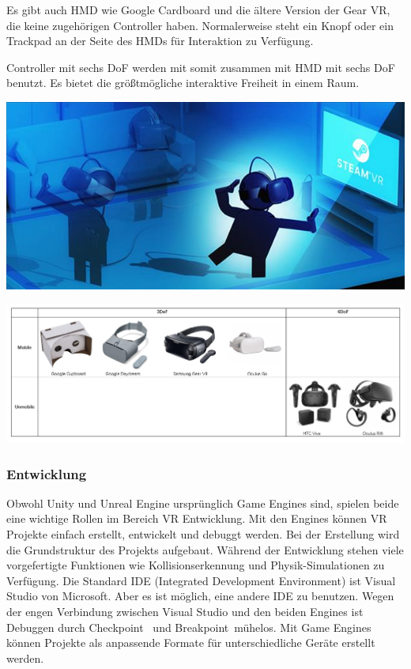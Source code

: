   Es gibt auch HMD wie Google Cardboard und die ältere Version der Gear VR, die keine zugehörigen Controller haben. Normalerweise steht ein Knopf oder ein Trackpad an der Seite des HMDs für Interaktion zu Verfügung.
  
  Controller mit sechs DoF werden mit somit zusammen mit HMD mit sechs DoF benutzt. Es bietet die größtmögliche interaktive Freiheit in einem Raum. 
  
\includegraphics[width=\textwidth]{images/6dcontroller.jpg}

\includegraphics[width=\textwidth]{images/vrDevicesTable.png}
  
  \subsubsection{Entwicklung}
  Obwohl Unity und Unreal Engine ursprünglich Game Engines sind, spielen beide eine wichtige Rollen im Bereich VR Entwicklung. Mit den Engines können VR Projekte einfach erstellt, entwickelt und debuggt werden. Bei der Erstellung wird die Grundstruktur des Projekts aufgebaut. Während der Entwicklung stehen viele vorgefertigte Funktionen wie Kollisionserkennung und Physik-Simulationen zu Verfügung. Die Standard IDE (Integrated Development Environment) ist Visual Studio von Microsoft. Aber es ist möglich, eine andere IDE zu benutzen. Wegen der engen Verbindung zwischen Visual Studio und den beiden Engines ist Debuggen durch \glqq Checkpoint \grqq\ und \glqq Breakpoint\grqq\ mühelos. Mit Game Engines können Projekte als anpassende Formate für unterschiedliche Geräte erstellt werden.

